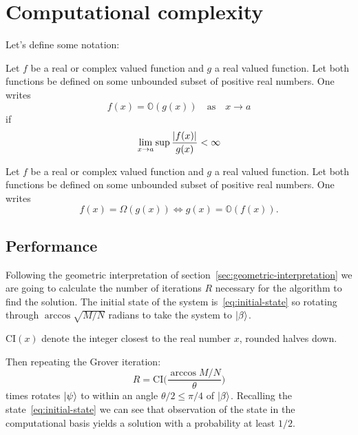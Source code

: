 \section{Computational complexity}
Let's define some notation:
\begin{defn}
   Let $f$ be a real or complex valued function and $g$ a real valued function. Let both functions be defined on some unbounded subset of positive real numbers. One writes
   \begin{equation*}
       f(x) = \mathbb{O}(g(x)) \quad \text{as} \quad x \rightarrow a
   \end{equation*}
   if 
   \begin{equation*}
      \lim_{x \to a} \sup{\frac{\lvert f(x)\rvert}{g(x)}} < \infty
   \end{equation*}
   \end{defn}
   \begin{defn}
      Let $f$ be a real or complex valued function and $g$ a real valued function. Let both functions be defined on some unbounded subset of positive real numbers. One writes
   \begin{equation*}
       f(x) = \Omega(g(x))
    \Longleftrightarrow
      g(x) = \mathbb{O}(f(x)).
   \end{equation*}
   \end{defn}
   

\subsection{Performance}\label{sec:performance}
Following the geometric interpretation of section~\ref{sec:geometric-interpretation} we are going to calculate the number of iterations $R$ necessary for the algorithm to find the solution. The initial state of the system is~\ref{eq:initial-state} so rotating through $\arccos{\sqrt{M/N}}$ radians to take the system to $\ket{\beta}$.
\begin{defn}
$\text{CI}(x)$ denote the integer closest to the real number $x$, rounded halves down.
\end{defn}
Then repeating the Grover iteration:
\begin{equation}\label{eq:R}
    R = \text{CI}\biggl(\frac{\arccos{M/N}}{\theta}\biggr)
\end{equation}
times rotates $\ket{\psi}$ to within an angle $\theta/2 \leq \pi/4$ of $\ket{\beta}$. Recalling the state~\ref{eq:initial-state} we can see that observation of the state in the computational basis yields a solution with a probability at least $1/2$. 

